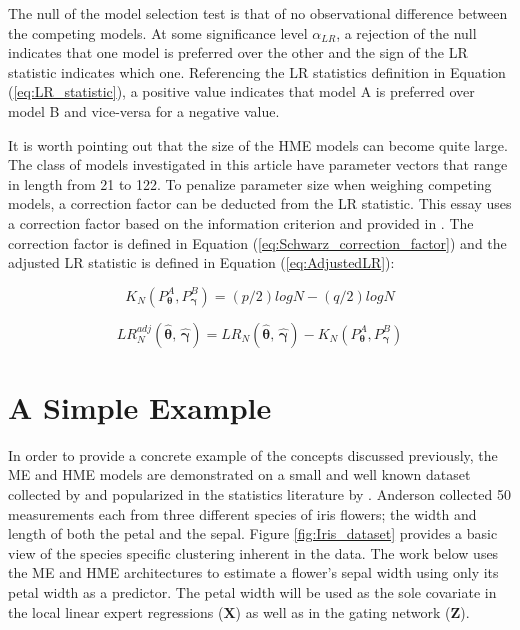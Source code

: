 \documentclass[12pt]{article}
\theoremstyle{definition}
\begin{document}
The null of the model selection test is that of no observational difference between the competing models. At some significance level $\alpha_{LR}$, a rejection of the null indicates that one model is preferred over the other and the sign of the LR statistic indicates which one. Referencing the LR statistics definition in Equation (\ref{eq:LR_statistic}), a positive value indicates that model A is preferred over model B and vice-versa for a negative value.

It is worth pointing out that the size of the HME models can become quite large. The class of models investigated in this article have parameter vectors that range in length from 21 to 122. To penalize parameter size when weighing competing models, a correction factor can be deducted from the LR statistic. This essay uses a correction factor based on the \citet{Schwarz1978} information criterion and provided in \citet{Voung1989}. The correction factor is defined in Equation (\ref{eq:Schwarz_correction_factor}) and the adjusted LR statistic is defined in Equation (\ref{eq:AdjustedLR}):

\begin{equation} \label{eq:Schwarz_correction_factor}
  K_{N}(P^{A}_{\boldsymbol{\theta}}, P^{B}_{\boldsymbol{\gamma}}) = (p / 2) log N - (q / 2) log N
\end{equation}

\begin{equation} \label{eq:AdjustedLR}
  LR_{N}^{adj}(\hat{\boldsymbol{\theta}}, \, \hat{\boldsymbol{\gamma}}) = LR_{N}(\hat{\boldsymbol{\theta}}, \, \hat{\boldsymbol{\gamma}}) - K_{N}(P^{A}_{\boldsymbol{\theta}}, P^{B}_{\boldsymbol{\gamma}})
\end{equation}


\section{A Simple Example} \label{sec:SimpleExample}

In order to provide a concrete example of the concepts discussed previously, the ME and HME models are demonstrated on a small and well known dataset collected by \citet{Anderson1936} and popularized in the statistics literature by \citet{Fisher1936}. Anderson collected 50 measurements each from three different species of iris flowers; the width and length of both the petal and the sepal. Figure \ref{fig:Iris_dataset} provides a basic view of the species specific clustering inherent in the data. The work below uses the ME and HME architectures to estimate a flower's sepal width using only its petal width as a predictor. The petal width will be used as the sole covariate in the local linear expert regressions ($\boldsymbol{X}$) as well as in the gating network ($\boldsymbol{Z}$). 
\end{document}
